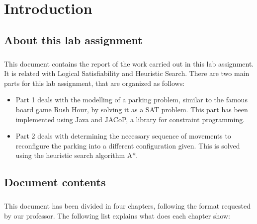\chapter{Introduction}
\label{chapter: introduction}

\section{About this lab assignment}

\paragraph{}
This document contains the report of the work carried out in this lab assignment. It is related with Logical Satisfiability and Heuristic Search. There are two main parts for this lab assignment, that are organized as follows:

\begin{itemize}
	\item Part 1 deals with the modelling of a parking problem, similar to the famous board game Rush Hour, by solving it as a SAT problem. This part has been implemented using Java and JACoP, a library for constraint programming.
    
	\item Part 2 deals with determining the necessary sequence of movements to reconfigure the parking into a different configuration given. This is solved using the heuristic search algorithm A*.
    
\end{itemize}

\section{Document contents}

\paragraph{}
This document has been divided in four chapters, following the format requested by our professor. The following list explains what does each chapter show:


